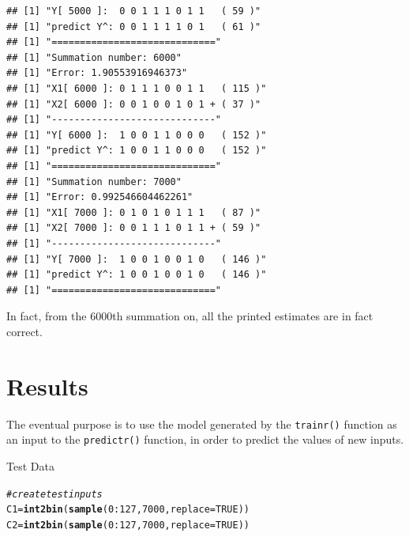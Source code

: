 \documentclass[british]{article}\usepackage[]{graphicx}\usepackage[]{color}
\makeatletter
\newcommand{\hlnum}[1]{\textcolor[rgb]{0.686,0.059,0.569}{#1}}%
\newcommand{\hlcom}[1]{\textcolor[rgb]{0.678,0.584,0.686}{\textit{#1}}}%
\newcommand{\hlopt}[1]{\textcolor[rgb]{0,0,0}{#1}}%
\newcommand{\hlstd}[1]{\textcolor[rgb]{0.345,0.345,0.345}{#1}}%
\newcommand{\hlkwb}[1]{\textcolor[rgb]{0.69,0.353,0.396}{#1}}%
\newcommand{\hlkwc}[1]{\textcolor[rgb]{0.333,0.667,0.333}{#1}}%
\newcommand{\hlkwd}[1]{\textcolor[rgb]{0.737,0.353,0.396}{\textbf{#1}}}%
\newenvironment{kframe}{%
 \def\at@end@of@kframe{}%
 \ifinner\ifhmode%
  \def\at@end@of@kframe{\end{minipage}}%
  \begin{minipage}{\columnwidth}%
 \fi\fi%
 \def\FrameCommand##1{\hskip\@totalleftmargin \hskip-\fboxsep
 \colorbox{shadecolor}{##1}\hskip-\fboxsep
     \hskip-\linewidth \hskip-\@totalleftmargin \hskip\columnwidth}%
 \MakeFramed {\advance\hsize-\width
   \@totalleftmargin\z@ \linewidth\hsize
   \@setminipage}}%
 {\par\unskip\endMakeFramed%
 \at@end@of@kframe}
\newenvironment{knitrout}{}{} %
\newcommand{\code}[1]{\texttt{#1}}
\makeatother
\begin{document}
\begin{table}[H]
\begin{knitrout}
\begin{kframe}
\begin{verbatim}
## [1] "Y[ 5000 ]:  0 0 1 1 1 0 1 1   ( 59 )"
## [1] "predict Y^: 0 0 1 1 1 1 0 1   ( 61 )"
## [1] "============================="
## [1] "Summation number: 6000"
## [1] "Error: 1.90553916946373"
## [1] "X1[ 6000 ]: 0 1 1 1 0 0 1 1   ( 115 )"
## [1] "X2[ 6000 ]: 0 0 1 0 0 1 0 1 + ( 37 )"
## [1] "-----------------------------"
## [1] "Y[ 6000 ]:  1 0 0 1 1 0 0 0   ( 152 )"
## [1] "predict Y^: 1 0 0 1 1 0 0 0   ( 152 )"
## [1] "============================="
## [1] "Summation number: 7000"
## [1] "Error: 0.992546604462261"
## [1] "X1[ 7000 ]: 0 1 0 1 0 1 1 1   ( 87 )"
## [1] "X2[ 7000 ]: 0 0 1 1 1 0 1 1 + ( 59 )"
## [1] "-----------------------------"
## [1] "Y[ 7000 ]:  1 0 0 1 0 0 1 0   ( 146 )"
## [1] "predict Y^: 1 0 0 1 0 0 1 0   ( 146 )"
## [1] "============================="
\end{verbatim}
\end{kframe}
\end{knitrout}

\end{table}


In fact, from the 6000th summation on, all the printed estimates are
in fact correct.


\section{Results}

The eventual purpose is to use the model generated by the \code{trainr()}
function as an input to the \code{predictr()} function, in order
to predict the values of new inputs.

\begin{table}[H]


\caption{Test Data}


\begin{knitrout}
\color{fgcolor}\begin{kframe}
\begin{alltt}
\hlcom{# create test inputs}
\hlstd{C1} \hlkwb{=} \hlkwd{int2bin}\hlstd{(} \hlkwd{sample}\hlstd{(}\hlnum{0}\hlopt{:}\hlnum{127}\hlstd{,} \hlnum{7000}\hlstd{,} \hlkwc{replace}\hlstd{=}\hlnum{TRUE}\hlstd{) )}
\hlstd{C2} \hlkwb{=} \hlkwd{int2bin}\hlstd{(} \hlkwd{sample}\hlstd{(}\hlnum{0}\hlopt{:}\hlnum{127}\hlstd{,} \hlnum{7000}\hlstd{,} \hlkwc{replace}\hlstd{=}\hlnum{TRUE}\hlstd{) )}
\end{alltt}
\end{kframe}
\end{knitrout}

\end{table}
\end{document}

